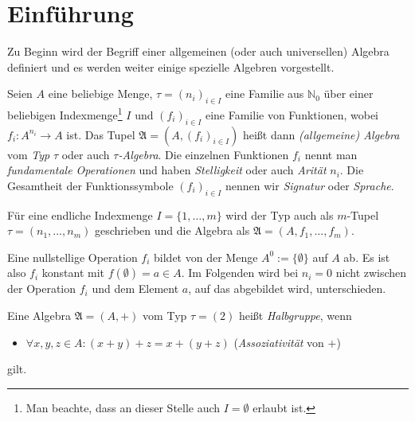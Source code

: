 \section{Einführung}

Zu Beginn wird der Begriff einer allgemeinen (oder auch universellen) Algebra definiert und es werden weiter einige spezielle Algebren vorgestellt.

\begin{definition}\label{def:algebra}\label{def:allg_algebra}
    Seien $A$ eine beliebige Menge, $\tau = (n_i)_{i \in I}$ eine Familie aus $\mathbb{N}_0$ über einer beliebigen Indexmenge\footnote{Man beachte, dass an dieser Stelle auch $I = \emptyset$ erlaubt ist.} $I$ und $(f_i)_{i \in I}$ eine Familie von Funktionen, wobei $f_i: A^{n_i} \to A$ ist. 
    Das Tupel $\mathfrak{A} = (A, (f_i)_{i \in I})$ heißt dann \emph{(allgemeine) Algebra} vom \emph{Typ} $\tau$ oder auch \emph{$\tau$-Algebra}. Die einzelnen Funktionen $f_i$ nennt man \emph{fundamentale Operationen} und haben \emph{Stelligkeit} oder auch \emph{Arität} $n_i$. Die Gesamtheit der Funktionssymbole $(f_i)_{i\in I}$ nennen wir \emph{Signatur} oder \emph{Sprache}.
\end{definition}

\begin{remark}
    Für eine endliche Indexmenge $I = \{1, \ldots, m\}$ wird der Typ auch als $m$-Tupel $\tau = (n_1, \ldots, n_m)$ geschrieben und die Algebra als $\mathfrak{A} = (A, f_1, \ldots, f_m)$.
\end{remark}

\begin{remark}
    Eine nullstellige Operation $f_i$ bildet von der Menge $A^0 := \{\emptyset\}$ auf $A$ ab. Es ist also $f_i$ konstant mit $f(\emptyset) = a \in A$. Im Folgenden wird bei $n_i = 0$ nicht zwischen der Operation $f_i$ und dem Element $a$, auf das abgebildet wird, unterschieden.
\end{remark}

\begin{definition}\label{def:halbgruppe}
    Eine Algebra $\mathfrak{A} = (A, +)$ vom Typ $\tau = (2)$ heißt \emph{Halbgruppe}, wenn 
    \begin{itemize}
        \item $\forall x,y,z \in A: (x + y) + z = x + (y + z)$ \tab (\emph{Assoziativität} von $+$)
    \end{itemize}
    gilt.
\end{definition}

